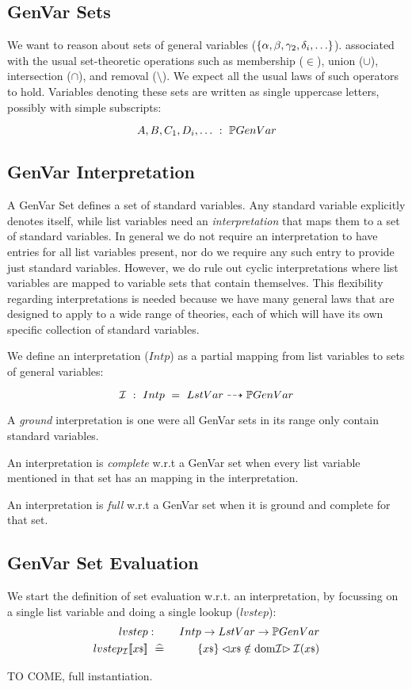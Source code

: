 \subsection{GenVar Sets}

We want to reason about sets of general variables
($\{{\alpha,\beta,\gamma_2,\delta_i,\dots}\}$).
associated with the usual set-theoretic operations such as
membership ($\in$),
union ($\cup$),
intersection ($\cap$),
and removal ($\setminus$).
We expect all the usual laws of such operators to hold.
Variables denoting these sets are written as single uppercase letters, 
possibly with simple subscripts:

$$A,B,C_1,D_i,\dots ~:~ \mathbb{P} GenVar$$

\subsection{GenVar Interpretation}

A GenVar Set defines a set of standard variables.
Any standard variable explicitly denotes itself,
while list variables need an \emph{interpretation} 
that maps them to a set of standard variables.
In general we do not require an interpretation to have entries
for all list variables present, 
nor do we require any such entry to provide just standard variables.
However, 
we do rule out cyclic interpretations where list variables are mapped
to variable sets that contain themselves.
This flexibility regarding interpretations is needed 
because we have many general laws 
that are designed to apply to a wide range of theories,
each of which will have its own specific collection of standard variables.

We define an interpretation ($Intp$) as a partial mapping from list variables
to sets of general variables:

\def\intp{\mathcal I}
$$\intp ~:~ Intp ~=~ LstVar \pfun \power GenVar $$

A \emph{ground} interpretation is one were all GenVar sets in its range
only contain standard variables.

An interpretation is \emph{complete} w.r.t a GenVar set 
when every list variable mentioned in that set 
has an mapping in the interpretation.

An interpretation is \emph{full} w.r.t a GenVar set 
when it is ground and complete for that set.

\subsection{GenVar Set Evaluation}

We start the definition of set evaluation w.r.t. an interpretation,
by focussing on a single list variable and doing a single lookup ($lvstep$):
\begin{eqnarray}
   lvstep &:& Intp \fun LstVar \fun \power GenVar
\\ lvstep_\intp\sem{\lst x}
   &\defs& 
   \setof{\lst x} \cond{\lst x \notin \dom\intp} \intp(\lst x)
\end{eqnarray}

TO COME, full instantiation.

